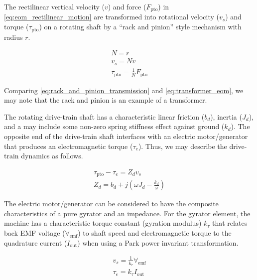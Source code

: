 \documentclass[lettersize,journal]{IEEEtran}
\begin{document}
The rectilinear vertical velocity ($v$) and force ($F_{\textrm{pto}}$) in \eqref{eq:eom_rectilinear_motion} are transformed into rotational velocity ($v_s$) and torque ($\tau_{\textrm{pto}}$) on a rotating shaft by a ``rack and pinion'' style mechanism with radius $r$.

\begin{subequations}
        \begin{gather}
                N = r \\
                v_s = N v \\
                \tau_{\textrm{pto}} = \frac{1}{N} F_{\textrm{pto}}
        \end{gather}
        \label{eq:rack_and_pinion_transmission}
\end{subequations}

\noindent{}Comparing \eqref{eq:rack_and_pinion_transmission} and \eqref{eq:transformer_eom}, we may note that the rack and pinion is an example of a transformer.

The rotating drive-train shaft has a characteristic linear friction ($b_d$), inertia ($J_d$), and a may include some non-zero spring stiffness effect against ground ($k_d$).
The opposite end of the drive-train shaft interfaces with an electric motor/generator that produces an electromagnetic torque ($\tau_e$).
Thus, we may describe the drive-train dynamics as follows.

\begin{subequations}
        \begin{gather}
                \tau_{\textrm{pto}} - \tau_e = Z_d v_s \\
                Z_d = b_d + j \left( \omega J_d - \frac{k_d}{\omega} \right)
        \end{gather}
\end{subequations}

The electric motor/generator can be considered to have the composite characteristics of a pure gyrator and an impedance.
For the gyrator element, the machine has a characteristic torque constant (gyration modulus) $k_\tau$ that relates back EMF voltage ($\forall_{\textrm{emf}}$) to shaft speed and electromagnetic torque to the quadrature current ($I_{\textrm{out}}$) when using a Park power invariant transformation.

\begin{subequations}
        \begin{gather}
                v_s = \frac{1}{k_\tau}\forall_{\textrm{emf}} \\
                \tau_e = k_\tau I_{\textrm{out}}
        \end{gather}
\end{subequations}
\end{document}

